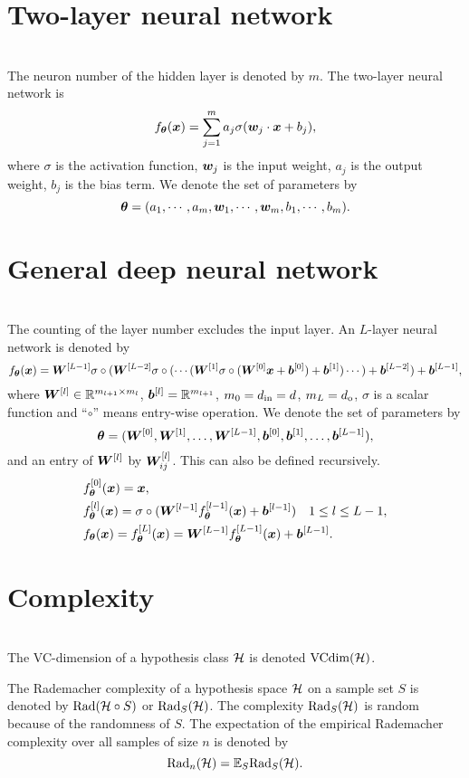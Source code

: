 \documentclass{article}
\begin{document}
\section{Two-layer neural network}~\\
The neuron number of the hidden layer is denoted by $m$. The two-layer neural network is 
\begin{equation}
    f_{\bm{\theta}}(\bm{x})=\sum_{j=1}^{m} a_j \sigma (\bm{w}_j\cdot \bm{x} + b_j),
\end{equation}
where $\sigma$ is the activation function, $\bm{w}_j$ is the input weight, $a_j$ is the output weight, $b_j$ is the bias term. We denote the set of parameters by 
\[
\bm{\theta}=(a_1,\cdots,a_m,\bm{w}_1,\cdots,\bm{w}_m,b_1,\cdots,b_m).
\] 
\section{General deep neural network}~\\
The counting of the layer number excludes the input layer. An $L$-layer neural network is denoted by
\begin{equation}
    f_{\bm{\theta}}(\bm{x}) = \bm{W}^{[L-1]} \sigma\circ(\bm{W}^{[L-2]}\sigma\circ(\cdots (\bm{W}^{[1]} \sigma\circ(\bm{W}^{[0]} \bm{x} + \bm{b}^{[0]} ) + \bm{b}^{[1]} )\cdots)+\bm{b}^{[L-2]})+\bm{b}^{[L-1]},
\end{equation}
where $\bm{W}^{[l]} \in \mathbb{R}^{m_{l+1}\times m_{l}}$, $\bm{b}^{[l]}=\mathbb{R}^{m_{l+1}}$, $m_0=d_{\rm in}=d$, $m_{L}=d_{\rm o}$,
$\sigma$ is a scalar function and ``$\circ$'' means entry-wise operation. 
We denote the set of parameters by \[
\bm{\theta}=(\bm{W}^{[0]},\bm{W}^{[1]},\ldots,\bm{W}^{[L-1]},\bm{b}^{[0]},\bm{b}^{[1]},\ldots,\bm{b}^{[L-1]}),
\] 
and  an entry of $\bm{W}^{[l]}$ by   $\bm{W}^{[l]}_{ij}$. This can also be defined recursively.
\begin{align}
    &f_{\bm{\theta}}^{[0]}(\bm{x})=\bm{x}, \\
    &f_{\bm{\theta}}^{[l]}(\bm{x})=\sigma\circ(\bm{W}^{[l-1]} f_{\bm{\theta}}^{[l-1]}(\bm{x}) + \bm{b}^{[l-1]}) \quad 1\leq l\leq L-1,\\
    &f_{\bm{\theta}}(\bm{x})=f_{\bm{\theta}}^{[L]}(\bm{x})=\bm{W}^{[L-1]} f_{\bm{\theta}}^{[L-1]}(\bm{x}) + \bm{b}^{[L-1]}.
\end{align}

\section{Complexity}~\\
The VC-dimension of a hypothesis class $\mathcal{H}$ is denoted ${\rm VCdim}(\mathcal{H})$.

The Rademacher complexity of a hypothesis space $\mathcal{H}$ on a sample set $S$ is denoted by ${\rm Rad} (\mathcal{H}\circ S)$ or ${\rm Rad}_{S} (\mathcal{H})$. The complexity ${\rm Rad}_{S} (\mathcal{H})$ is random because of the randomness of $S$. The expectation of the empirical Rademacher complexity over all samples of size $n$ is denoted by 
\[
{\rm Rad}_{n} (\mathcal{H})=\mathbb{E}_{S} {\rm Rad}_{S} (\mathcal{H}).
\]
\end{document}
